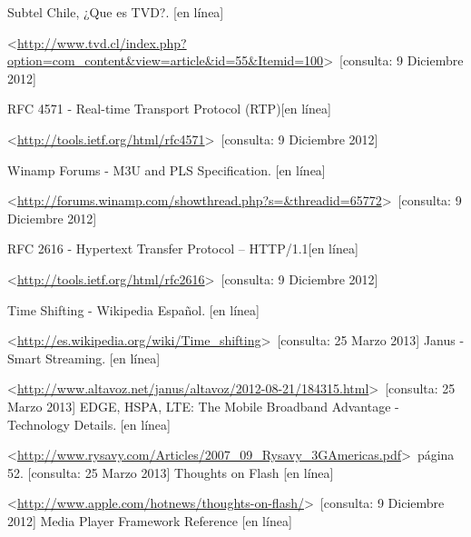 \begin{thebibliography}{99}
\begin{sloppypar}



%
Subtel Chile, ¿Que es TVD?. [en línea]\

\textless \url{http://www.tvd.cl/index.php?option=com_content&view=article&id=55&Itemid=100}\textgreater \ [consulta: 9 Diciembre 2012]

%
RFC 4571 - Real-time Transport Protocol (RTP)[en línea]\

\textless \url{http://tools.ietf.org/html/rfc4571}\textgreater \ [consulta: 9 Diciembre 2012]

%
Winamp Forums - M3U and PLS Specification. [en línea]\

\textless \url{http://forums.winamp.com/showthread.php?s=&threadid=65772}\textgreater \ [consulta: 9 Diciembre 2012]

%
RFC 2616 - Hypertext Transfer Protocol -- HTTP/1.1[en línea]\

\textless \url{http://tools.ietf.org/html/rfc2616}\textgreater \ [consulta: 9 Diciembre 2012]

%
%
Time Shifting - Wikipedia Español. [en línea]\

\textless \url{http://es.wikipedia.org/wiki/Time_shifting}\textgreater \ [consulta: 25 Marzo 2013]
%
Janus - Smart Streaming. [en línea]\

\textless \url{http://www.altavoz.net/janus/altavoz/2012-08-21/184315.html}\textgreater \ [consulta: 25 Marzo 2013]
%
EDGE, HSPA, LTE: The Mobile Broadband Advantage - Technology Details. [en línea]\

\textless \url{http://www.rysavy.com/Articles/2007_09_Rysavy_3GAmericas.pdf}\textgreater \ página 52. [consulta: 25 Marzo 2013]
%
Thoughts on Flash [en línea]\

\textless \url{http://www.apple.com/hotnews/thoughts-on-flash/}\textgreater \ [consulta: 9 Diciembre 2012]
%
Media Player Framework Reference [en línea]\


\end{sloppypar}
\end{thebibliography}
